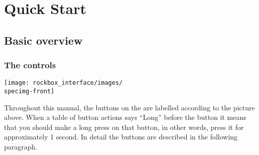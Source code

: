 \chapter{\label{ref:rockbox_interface}Quick Start}
\section{Basic overview}
\subsection{The \daps{} controls}

\begin{center}
\texttt{[image: rockbox\_interface/images/\\specimg-front]}

\end{center}

Throughout this manual, the buttons on the \dap{} are labelled according to the
picture above. When a table of button actions says ``Long'' before the button it
means that you should make a long press on that button, in other words, press it
for approximately 1 second. In detail the buttons are described in the following
paragraph.

